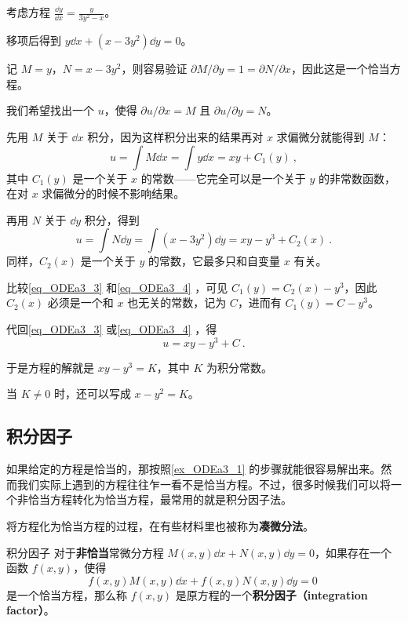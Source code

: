 \begin{example}{}\label{ex_ODEa3_1}
考虑方程 $\frac{\dd y}{\dd x}=\frac{y}{3y^2-x}$。

移项后得到 $y\dd x+(x-3y^2)\dd y=0$。

记 $M=y$，$N=x-3y^2$，则容易验证 $\partial M/\partial y= 1 =\partial N/\partial x$，因此这是一个恰当方程。

我们希望找出一个 $u$，使得 $\partial u/\partial x=M$ 且 $\partial u/\partial y=N$。

先用 $M$ 关于 $\dd x$ 积分，因为这样积分出来的结果再对 $x$ 求偏微分就能得到 $M$：
\begin{equation}\label{eq_ODEa3_3}
u=\int M\dd x=\int y\dd x=xy+C_1(y)~,
\end{equation}
其中 $C_1(y)$ 是一个关于 $x$ 的常数——它完全可以是一个关于 $y$ 的非常数函数，在对 $x$ 求偏微分的时候不影响结果。

再用 $N$ 关于 $\dd y$ 积分，得到
\begin{equation}\label{eq_ODEa3_4}
u=\int N\dd y=\int (x-3y^2)\dd y=xy-y^3+C_2(x)~.
\end{equation}
同样，$C_2(x)$ 是一个关于 $y$ 的常数，它最多只和自变量 $x$ 有关。

比较\autoref{eq_ODEa3_3} 和\autoref{eq_ODEa3_4} ，可见 $C_1(y)=C_2(x)-y^3$，因此 $C_2(x)$ 必须是一个和 $x$ 也无关的常数，记为 $C$，进而有 $C_1(y)=C-y^3$。

代回\autoref{eq_ODEa3_3} 或\autoref{eq_ODEa3_4} ，得
\begin{equation}
u=xy-y^3+C~.
\end{equation}

于是方程的解就是 $xy-y^3=K$，其中 $K$ 为积分常数。

当 $K\not=0$ 时，还可以写成 $x-y^2=K$。

\end{example}


\subsection{积分因子}

如果给定的方程是恰当的，那按照\autoref{ex_ODEa3_1} 的步骤就能很容易解出来。然而我们实际上遇到的方程往往乍一看不是恰当方程。不过，很多时候我们可以将一个非恰当方程转化为恰当方程，最常用的就是积分因子法。

将方程化为恰当方程的过程，在有些材料里也被称为\textbf{凑微分法}。

\begin{definition}{积分因子}
对于\textbf{非恰当}常微分方程 $M(x, y)\dd x+N(x, y)\dd y=0$，如果存在一个函数 $f(x, y)$，使得
\begin{equation}\label{eq_ODEa3_5}
f(x, y)M(x, y)\dd x+f(x, y)N(x, y)\dd y=0~
\end{equation}
是一个恰当方程，那么称 $f(x, y)$ 是原方程的一个\textbf{积分因子（integration factor）}。
\end{definition}

